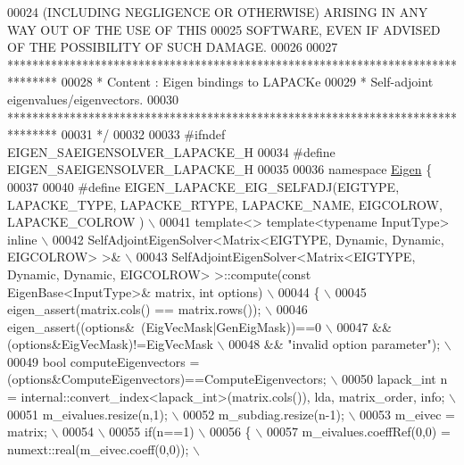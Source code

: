 \begin{DoxyCode}
00024 \textcolor{comment}{ (INCLUDING NEGLIGENCE OR OTHERWISE) ARISING IN ANY WAY OUT OF THE USE OF THIS}
00025 \textcolor{comment}{ SOFTWARE, EVEN IF ADVISED OF THE POSSIBILITY OF SUCH DAMAGE.}
00026 \textcolor{comment}{}
00027 \textcolor{comment}{ ********************************************************************************}
00028 \textcolor{comment}{ *   Content : Eigen bindings to LAPACKe}
00029 \textcolor{comment}{ *    Self-adjoint eigenvalues/eigenvectors.}
00030 \textcolor{comment}{ ********************************************************************************}
00031 \textcolor{comment}{*/}
00032 
00033 \textcolor{preprocessor}{#ifndef EIGEN\_SAEIGENSOLVER\_LAPACKE\_H}
00034 \textcolor{preprocessor}{#define EIGEN\_SAEIGENSOLVER\_LAPACKE\_H}
00035 
00036 \textcolor{keyword}{namespace }\hyperlink{namespace_eigen}{Eigen} \{ 
00037 
00040 \textcolor{preprocessor}{#define EIGEN\_LAPACKE\_EIG\_SELFADJ(EIGTYPE, LAPACKE\_TYPE, LAPACKE\_RTYPE, LAPACKE\_NAME, EIGCOLROW,
       LAPACKE\_COLROW ) \(\backslash\)}
00041 \textcolor{preprocessor}{template<> template<typename InputType> inline \(\backslash\)}
00042 \textcolor{preprocessor}{SelfAdjointEigenSolver<Matrix<EIGTYPE, Dynamic, Dynamic, EIGCOLROW> >& \(\backslash\)}
00043 \textcolor{preprocessor}{SelfAdjointEigenSolver<Matrix<EIGTYPE, Dynamic, Dynamic, EIGCOLROW> >::compute(const EigenBase<InputType>&
       matrix, int options) \(\backslash\)}
00044 \textcolor{preprocessor}{\{ \(\backslash\)}
00045 \textcolor{preprocessor}{  eigen\_assert(matrix.cols() == matrix.rows()); \(\backslash\)}
00046 \textcolor{preprocessor}{  eigen\_assert((options&~(EigVecMask|GenEigMask))==0 \(\backslash\)}
00047 \textcolor{preprocessor}{          && (options&EigVecMask)!=EigVecMask \(\backslash\)}
00048 \textcolor{preprocessor}{          && "invalid option parameter"); \(\backslash\)}
00049 \textcolor{preprocessor}{  bool computeEigenvectors = (options&ComputeEigenvectors)==ComputeEigenvectors; \(\backslash\)}
00050 \textcolor{preprocessor}{  lapack\_int n = internal::convert\_index<lapack\_int>(matrix.cols()), lda, matrix\_order, info; \(\backslash\)}
00051 \textcolor{preprocessor}{  m\_eivalues.resize(n,1); \(\backslash\)}
00052 \textcolor{preprocessor}{  m\_subdiag.resize(n-1); \(\backslash\)}
00053 \textcolor{preprocessor}{  m\_eivec = matrix; \(\backslash\)}
00054 \textcolor{preprocessor}{\(\backslash\)}
00055 \textcolor{preprocessor}{  if(n==1) \(\backslash\)}
00056 \textcolor{preprocessor}{  \{ \(\backslash\)}
00057 \textcolor{preprocessor}{    m\_eivalues.coeffRef(0,0) = numext::real(m\_eivec.coeff(0,0)); \(\backslash\)}

\end{DoxyCode}
